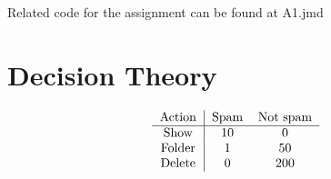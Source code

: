 \documentclass[12pt,letter]{article}
\begin{document}

Related code for the assignment can be found at A1.jmd

\section{Decision Theory}
\begin{align*}
\begin{tabular}{c|cc}
  Action & Spam & Not spam \\ \hline
  Show   & 10 & 0 \\
  Folder & 1  & 50 \\
  Delete & 0  & 200
\end{tabular}  
\end{align*}
\end{document}
